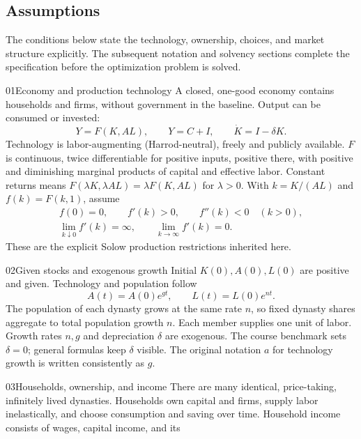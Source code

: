 \subsection{Assumptions}\label{assumptions}

The conditions below state the technology, ownership, choices, and market
structure explicitly. The subsequent notation and solvency sections complete
the specification before the optimization problem is solved.

\begin{modelsetup}[1]
\begin{modelcondition}{01}{Economy and production technology}
A closed, one-good economy contains households and firms, without government
in the baseline. Output can be consumed or invested:
\[
Y=F(K,AL),\qquad Y=C+I,\qquad \dot K=I-\delta K.
\]
Technology is labor-augmenting (Harrod-neutral), freely and publicly available.
$F$ is continuous, twice differentiable for positive inputs, positive there,
with positive and diminishing marginal products of capital and effective
labor. Constant returns means
$F(\lambda K,\lambda AL)=\lambda F(K,AL)$ for $\lambda>0$.
With $k=K/(AL)$ and $f(k)=F(k,1)$, assume
\[
\begin{gathered}
f(0)=0,\qquad f'(k)>0,\qquad f''(k)<0\quad(k>0),\\
\lim_{k\downarrow0}f'(k)=\infty,\qquad
\lim_{k\to\infty}f'(k)=0.
\end{gathered}
\]
These are the explicit Solow production restrictions inherited here.
\end{modelcondition}
\begin{modelcondition}{02}{Given stocks and exogenous growth}
Initial $K(0),A(0),L(0)$ are positive and given. Technology and population follow
\[
A(t)=A(0)e^{gt},\qquad L(t)=L(0)e^{nt}.
\]
The population of each dynasty grows at the same rate $n$, so fixed dynasty
shares aggregate to total population growth $n$. Each member supplies one unit
of labor. Growth rates $n,g$ and depreciation $\delta$ are exogenous.
The course benchmark sets $\delta=0$; general formulas keep $\delta$ visible.
The original notation $a$ for technology growth is written consistently as $g$.
\end{modelcondition}
\begin{modelcondition}{03}{Households, ownership, and income}
There are many identical, price-taking, infinitely lived dynasties. Households
own capital and firms, supply labor inelastically, and choose consumption and
saving over time. Household income consists of wages, capital income, and its

\end{modelcondition}
\end{modelsetup}
